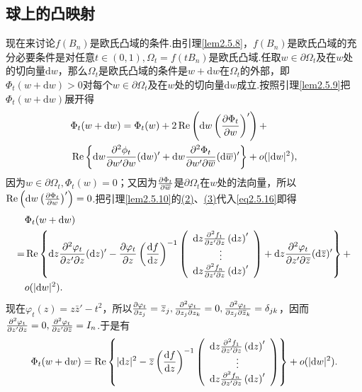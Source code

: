\subsection{球上的凸映射}
现在来讨论$f(B_n)$是欧氏凸域的条件.由引理\ref{lem2.5.8}，$f(B_n)$是欧氏凸域的充分必要条件是对任意$t\in(0,1),\Omega_t=f(tB_n)$是欧氏凸域.任取$w\in\partial\Omega_t$及在$w$处的切向量$\mathrm{d}w$，那么$\Omega_t$是欧氏凸域的条件是$w+\mathrm{d}w$在$\Omega_t$的外部，即$\Phi_t(w+\mathrm{d}w)>0$对每个$w\in\partial\Omega_t$及在$w$处的切向量$\mathrm{d}w$成立.按照引理\ref{lem2.5.9}把$\Phi_t(w+\mathrm{d}w)$展开得
\begin{align}\label{eq2.5.16}
	&\Phi_t(w+\mathrm{d}w)=\Phi_t(w)+2\operatorname{Re}\left(\mathrm{d}w\left(\frac{\partial \Phi_t}{\partial w}\right)'\right)+\notag\\
	&\operatorname{Re}\left\{\mathrm{d}w\frac{\partial^2 \phi_t}{\partial w'\partial w}(\mathrm{d}w)'+\mathrm{d}w\frac{\partial^2 \Phi_t}{\partial w'\partial {}\mkern1mu\overline{\mkern-1muw}}(\mathrm{d}{}\mkern1mu\overline{\mkern-1muw})'\right\}+o(|\mathrm{d}w|^2),
\end{align}
因为$w\in\partial\Omega_t,\Phi_t(w)=0$；又因为$\frac{\partial \Phi_t}{\partial {}\mkern1mu\overline{\mkern-1muw}}$是$\partial\Omega_t$在$w$处的法向量，所以$\operatorname{Re}\left(\mathrm{d}w\left(\frac{\partial \Phi_t}{\partial w}\right)'\right)=0$.把引理\ref{lem2.5.10}的\hyperlink{2.5.10}{(2)}、\hyperlink{2.5.10}{(3)}代入\eqref{eq2.5.16}即得
\begin{align*}
	&\Phi_t(w+\mathrm{d}w)\\
	=&\operatorname{Re}\left\{\mathrm{d}z\frac{\partial^2 \varphi_t}{\partial z'\partial z}(\mathrm{d}z)'-\frac{\partial \varphi_t}{\partial z}\left(\frac{\mathop{}\!\mathrm df}{\mathop{}\!\mathrm dz}\right)^{-1}\left(\begin{array}{ccc}
		\mathrm{d}z\frac{\partial^2 f_1}{\partial z'\partial z}\left(\mathrm{d}z\right)'\\
		\vdots\\
		\mathrm{d}z\frac{\partial^2 f_n}{\partial z'\partial z}\left(\mathrm{d}z\right)'
	\end{array}\right)+\mathrm{d}z\frac{\partial^2 \varphi_t}{\partial z'\partial {}\mkern1mu\overline{\mkern-1muz}}(\mathrm{d}{}\mkern1mu\overline{\mkern-1muz})'\right\}+\\
&o(|\mathrm{d}w|^2).
\end{align*}
现在$\varphi_t(z)=z\bar{z}'-t^2$，所以$\frac{\partial \varphi_t}{\partial z_j}={}\mkern1mu\overline{\mkern-1muz}_j,\frac{\partial^2 \varphi_t}{\partial z_j\partial z_k}=0,\frac{\partial^2 \varphi_t}{\partial z_j\partial {}\mkern1mu\overline{\mkern-1muz}_k}=\delta_{jk}$，因而\\
$\frac{\partial^2 \varphi_t}{\partial z'\partial z}=0,\frac{\partial^2 \varphi_t}{\partial z'\partial {}\mkern1mu\overline{\mkern-1muz}}=I_n$.于是有
\[\Phi_t(w+\mathrm{d}w)=\operatorname{Re}\left\{|\mathrm{d}z|^2-{}\mkern1mu\overline{\mkern-1muz}\left(\frac{\mathop{}\!\mathrm df}{\mathop{}\!\mathrm dz}\right)^{-1}
\left(
\begin{array}{ccc}
	\mathrm{d}z\frac{\partial^2 f_1}{\partial z'\partial z}\left(\mathrm{d}z\right)'\\
	\vdots\\
	\mathrm{d}z\frac{\partial^2 f_n}{\partial z'\partial z}\left(\mathrm{d}z\right)'
\end{array}\right)\right\}+o(|\mathrm{d}w|^2).\]

